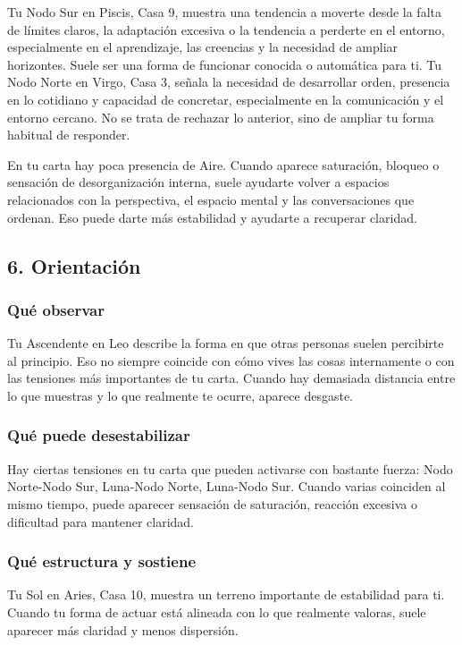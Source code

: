 \documentclass[11pt,a4paper]{article}\usepackage[utf8]{inputenc}
\begin{document}
\vspace{0.3cm}
Tu Nodo Sur en Piscis, Casa 9, muestra una tendencia a moverte desde la falta de límites claros, la adaptación excesiva o la tendencia a perderte en el entorno, especialmente en el aprendizaje, las creencias y la necesidad de ampliar horizontes. Suele ser una forma de funcionar conocida o automática para ti. Tu Nodo Norte en Virgo, Casa 3, señala la necesidad de desarrollar orden, presencia en lo cotidiano y capacidad de concretar, especialmente en la comunicación y el entorno cercano. No se trata de rechazar lo anterior, sino de ampliar tu forma habitual de responder.

\vspace{0.3cm}
En tu carta hay poca presencia de Aire. Cuando aparece saturación, bloqueo o sensación de desorganización interna, suele ayudarte volver a espacios relacionados con la perspectiva, el espacio mental y las conversaciones que ordenan. Eso puede darte más estabilidad y ayudarte a recuperar claridad.

\vspace{0.8cm}

\subsection{6. Orientación}

\subsubsection*{Qué observar}
Tu Ascendente en Leo describe la forma en que otras personas suelen percibirte al principio. Eso no siempre coincide con cómo vives las cosas internamente o con las tensiones más importantes de tu carta. Cuando hay demasiada distancia entre lo que muestras y lo que realmente te ocurre, aparece desgaste.

\subsubsection*{Qué puede desestabilizar}
Hay ciertas tensiones en tu carta que pueden activarse con bastante fuerza: Nodo Norte-Nodo Sur, Luna-Nodo Norte, Luna-Nodo Sur. Cuando varias coinciden al mismo tiempo, puede aparecer sensación de saturación, reacción excesiva o dificultad para mantener claridad.

\subsubsection*{Qué estructura y sostiene}
Tu Sol en Aries, Casa 10, muestra un terreno importante de estabilidad para ti. Cuando tu forma de actuar está alineada con lo que realmente valoras, suele aparecer más claridad y menos dispersión.
\end{document}

